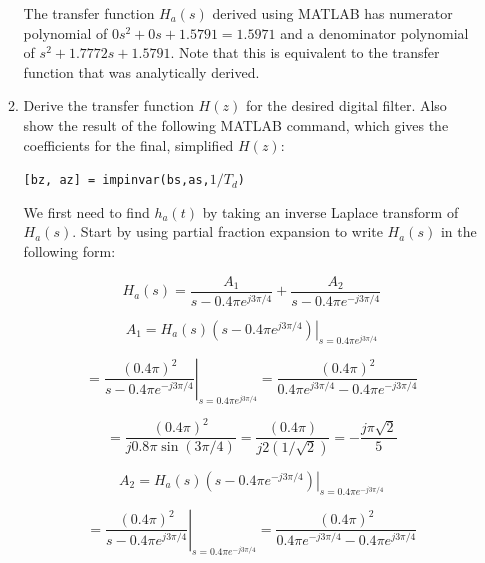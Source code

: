 \documentclass[fleqn]{article}
\begin{document}
\begin{enumerate}[nolistsep]
\begin{enumerate}[nolistsep]
				The transfer function $H_a(s)$ derived using MATLAB has numerator polynomial of $0s^2 + 0s + 1.5791 = 1.5971$ and a denominator polynomial of $s^2 + 1.7772s + 1.5791$. Note that this is equivalent to the transfer function that was analytically derived.
				
				\item Derive the transfer function $H(z)$ for the desired digital filter. Also show the result of the following MATLAB command, which gives the coefficients for the final, simplified $H(z)$:
				
				\texttt{[bz, az] = impinvar(bs,as,$1/T_d$)}
				
				We first need to find $h_a(t)$ by taking an inverse Laplace transform of $H_a(s)$. Start by using partial fraction expansion to write $H_a(s)$ in the following form:
				
				\begin{equation*}
					H_a(s) = \frac{A_1}{s - 0.4{\pi}e^{j3{\pi}/4}} +  \frac{A_2}{s - 0.4{\pi}e^{-j3{\pi}/4}}
				\end{equation*}
				
				\begin{equation*}
					A_1 = \left.H_a(s)(s - 0.4{\pi}e^{j3{\pi}/4})\right\vert_{s=0.4{\pi}e^{j3\pi/4}}
				\end{equation*}
				
				\begin{equation*}
					= \left.\frac{(0.4\pi)^2}{s - 0.4{\pi}e^{-j3{\pi}/4}}\right\vert_{s = 0.4{\pi}e^{j3{\pi}/4}} = \frac{(0.4\pi)^2}{0.4{\pi}e^{j3{\pi}/4} - 0.4{\pi}e^{-j3{\pi}/4}}
				\end{equation*}
				
				\begin{equation*}
					  = \frac{(0.4\pi)^2}{j0.8{\pi}\sin(3\pi/4)} = \frac{(0.4\pi)}{j2(1/\sqrt{2})} = -\frac{j\pi\sqrt{2}}{5}
				\end{equation*}
				
				\begin{equation*}
					A_2 = \left.H_a(s)(s - 0.4{\pi}e^{-j3{\pi}/4})\right\vert_{s = 0.4{\pi}e^{-j3{\pi}/4}}
				\end{equation*}
				
				\begin{equation*}
					= \left.\frac{(0.4\pi)^2}{s - 0.4{\pi}e^{j3{\pi}/4}}\right\vert_{s = 0.4{\pi}e^{-j3{\pi}/4}} = \frac{(0.4\pi)^2}{0.4{\pi}e^{-j3{\pi}/4} - 0.4{\pi}e^{j3{\pi}/4}}
				\end{equation*}
				

\end{enumerate}
\end{enumerate}
\end{document}
